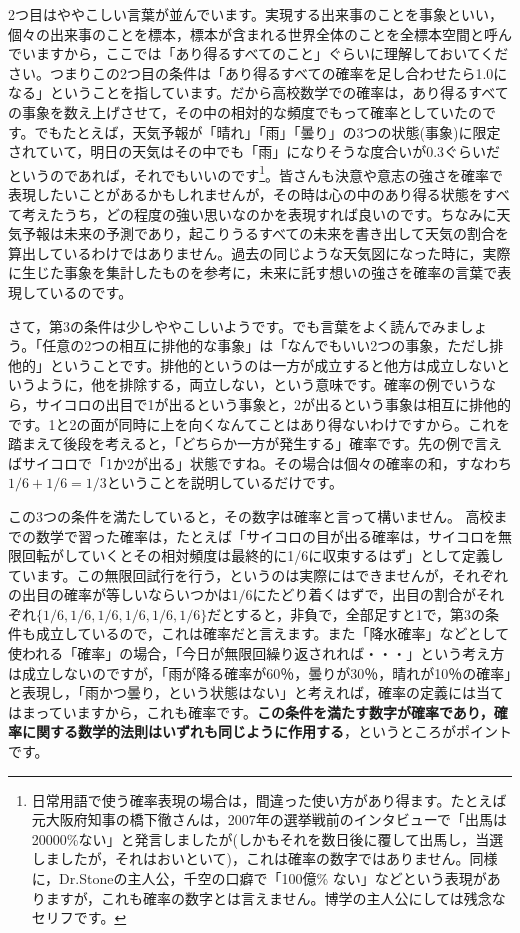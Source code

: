 \documentclass{ltjbook}
\begin{document}
2つ目はややこしい言葉が並んでいます。実現する出来事のことを事象といい，個々の出来事のことを標本，標本が含まれる世界全体のことを全標本空間と呼んでいますから，ここでは「あり得るすべてのこと」ぐらいに理解しておいてください。つまりこの2つ目の条件は「あり得るすべての確率を足し合わせたら1.0になる」ということを指しています。だから高校数学での確率は，あり得るすべての事象を数え上げさせて，その中の相対的な頻度でもって確率としていたのです。でもたとえば，天気予報が「晴れ」「雨」「曇り」の3つの状態(事象)に限定されていて，明日の天気はその中でも「雨」になりそうな度合いが0.3ぐらいだというのであれば，それでもいいのです\footnote{日常用語で使う確率表現の場合は，間違った使い方があり得ます。たとえば元大阪府知事の橋下徹さんは，2007年の選挙戦前のインタビューで「出馬は20000\%ない」と発言しましたが(しかもそれを数日後に覆して出馬し，当選しましたが，それはおいといて)，これは確率の数字ではありません。同様に，Dr.Stoneの主人公，千空の口癖で「100億\% ない」などという表現がありますが，これも確率の数字とは言えません。博学の主人公にしては残念なセリフです。}。皆さんも決意や意志の強さを確率で表現したいことがあるかもしれませんが，その時は心の中のあり得る状態をすべて考えたうち，どの程度の強い思いなのかを表現すれば良いのです。ちなみに天気予報は未来の予測であり，起こりうるすべての未来を書き出して天気の割合を算出しているわけではありません。過去の同じような天気図になった時に，実際に生じた事象を集計したものを参考に，未来に託す想いの強さを確率の言葉で表現しているのです。

さて，第3の条件は少しややこしいようです。でも言葉をよく読んでみましょう。「任意の2つの相互に排他的な事象」は「なんでもいい2つの事象，ただし排他的」ということです。排他的というのは一方が成立すると他方は成立しないというように，他を排除する，両立しない，という意味です。確率の例でいうなら，サイコロの出目で1が出るという事象と，2が出るという事象は相互に排他的です。1と2の面が同時に上を向くなんてことはあり得ないわけですから。これを踏まえて後段を考えると，「どちらか一方が発生する」確率です。先の例で言えばサイコロで「1か2が出る」状態ですね。その場合は個々の確率の和，すなわち$1/6+1/6=1/3$ということを説明しているだけです。

この3つの条件を満たしていると，その数字は確率と言って構いません。
高校までの数学で習った確率は，たとえば「サイコロの目が出る確率は，サイコロを無限回転がしていくとその相対頻度は最終的に1/6に収束するはず」として定義しています。この無限回試行を行う，というのは実際にはできませんが，それぞれの出目の確率が等しいならいつかは$1/6$にたどり着くはずで，出目の割合がそれぞれ$\{ 1/6,1/6,1/6,1/6,1/6,1/6 \}$だとすると，非負で，全部足すと1で，第3の条件も成立しているので，これは確率だと言えます。また「降水確率」などとして使われる「確率」の場合，「今日が無限回繰り返されれば・・・」という考え方は成立しないのですが，「雨が降る確率が60％，曇りが30％，晴れが10％の確率」と表現し，「雨かつ曇り，という状態はない」と考えれば，確率の定義には当てはまっていますから，これも確率です。\textbf{この条件を満たす数字が確率であり，確率に関する数学的法則はいずれも同じように作用する}，というところがポイントです。
\end{document}
